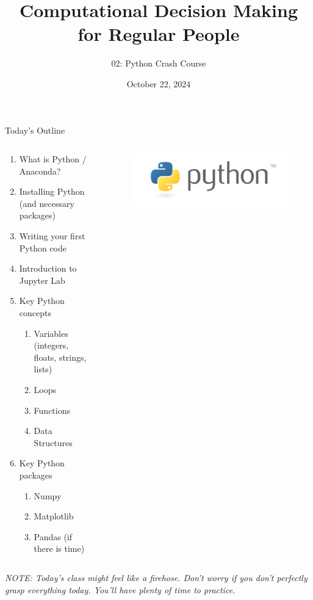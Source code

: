 \documentclass[10pt, aspectratio=169]{beamer}
\title{Computational Decision Making for Regular People}
\subtitle{02: Python Crash Course}
\date{October 22, 2024}
\begin{document}
\begin{frame}
    \maketitle
\end{frame}

\begin{frame}{Today's Outline}
    \begin{columns}
        \begin{column}{0.5\textwidth}
            \begin{enumerate}
                \item What is Python / Anaconda?
                \item Installing Python (and necessary packages)
                \item Writing your first Python code
                \item Introduction to Jupyter Lab
                \item Key Python concepts
                \begin{enumerate}
                    \item Variables (integers, floats, strings, lists)
                    \item Loops
                    \item Functions
                    \item Data Structures
                \end{enumerate}
                \item Key Python packages
                \begin{enumerate}
                    \item Numpy
                    \item Matplotlib
                    \item Pandas (if there is time)
                \end{enumerate}
            \end{enumerate}
        \end{column}
        \begin{column}{0.5\textwidth}
            \begin{figure}
                \includegraphics[width=0.95\linewidth]{PythonLogo.png}
            \end{figure}
        \end{column}
    \end{columns}
    \vspace{0.4cm}
    \textit{NOTE: Today's class might feel like a firehose. Don't worry if you don't perfectly grasp everything today. You'll have plenty of time to practice.}
\end{frame}
\end{document}
